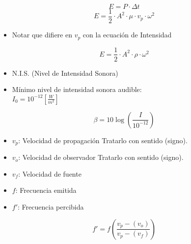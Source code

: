 \begin{equation}
    E = P \cdot \Delta t
\end{equation}
\begin{equation}
    E = \frac{1}{2} \cdot A^2 \cdot \mu \cdot v_p \cdot \omega^2
\end{equation}

\begin{itemize}
    \item Notar que difiere en $v_p$ con la ecuación de Intensidad
\end{itemize}
\begin{equation}
    E = \frac{1}{2} \cdot A^2 \cdot \rho \cdot \omega^2
\end{equation}

\vspace{0.25cm}
\begin{itemize}
    \item N.I.S. (Nivel de Intensidad Sonora)
    \item Mínimo nivel de intensidad sonora audible: \\ $I_0 = 10^{-12} \left[\frac{W}{m^2}\right]$
\end{itemize}
\begin{equation}
    \beta = 10\log\left(\frac{I}{10^{-12}}\right)
\end{equation}

\begin{itemize}
    \item $v_p$: Velocidad de propagación Tratarlo con sentido (signo).
    \item $v_o$: Velocidad de observador Tratarlo con sentido (signo).
    \item $v_f$: Velocidad de fuente
    \item $f$: Frecuencia emitida
    \item $f'$: Frecuencia percibida
\end{itemize}
\begin{equation}
    f' = f \left(\frac{v_p - (v_o)}{v_p - (v_f)}\right)
\end{equation}

